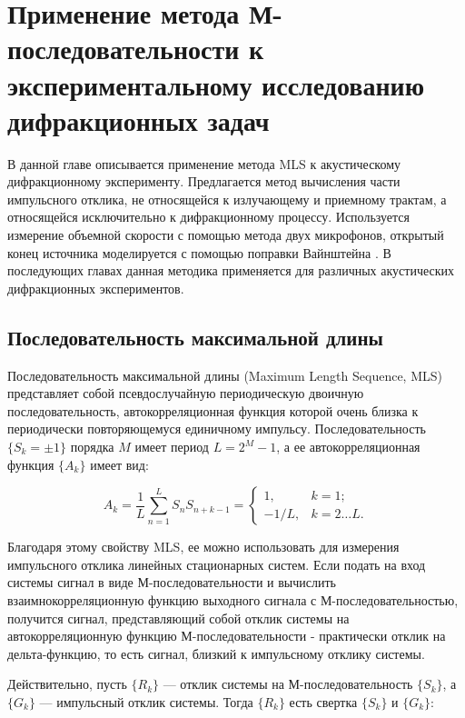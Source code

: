 \chapter{Применение метода М-последовательности к экспериментальному исследованию дифракционных задач}

В данной главе описывается применение метода MLS к акустическому дифракционному эксперименту. Предлагается метод вычисления части импульсного отклика, не относящейся к излучающему и приемному трактам, а относящейся исключительно к дифракционному процессу. Используется измерение объемной скорости с помощью метода двух микрофонов, открытый конец источника моделируется с помощью поправки Вайнштейна \cite{Weinstein1966}. В последующих главах данная методика применяется для различных акустических дифракционных экспериментов.

\section{Последовательность максимальной длины}

Последовательность максимальной длины (Maximum Length Sequence, MLS) представляет собой псевдослучайную периодическую двоичную последовательность, автокорреляционная функция которой очень близка к периодически повторяющемуся единичному импульсу. Последовательность $\{ S_k = \pm 1 \}$ порядка $M$ имеет период $L = 2^M - 1$, а ее автокорреляционная функция $\{ A_k\}$ имеет вид:

\begin{equation}
A_k = \frac{1}{L} \sum_{n=1}^{L} S_n S_{n+k-1} = 
\begin{cases}
1, & k = 1;\\
-1/L, & k=2\dots L.
\end{cases}
\end{equation}

Благодаря этому свойству MLS, ее можно использовать для измерения импульсного отклика линейных стационарных систем. Если подать на вход системы сигнал в виде М-последовательности и вычислить взаимнокорреляционную функцию выходного сигнала с М-последовательностью, получится сигнал, представляющий собой отклик системы на автокорреляционную функцию М-последовательности - практически отклик на дельта-функцию, то есть сигнал, близкий к импульсному отклику системы.

Действительно, пусть $\{R_k \}$ — отклик системы на М-последовательность  $\{S_k \}$, а  $\{G_k \}$ — импульсный отклик системы. Тогда  $\{R_k \}$ есть свертка  $\{S_k \}$ и  $\{G_k \}$:

